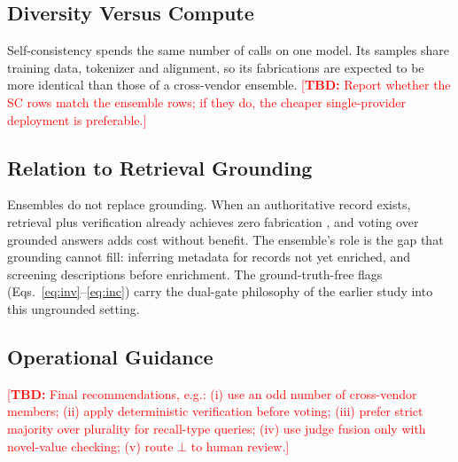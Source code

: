 \documentclass[11pt]{article}
\newcommand{\TBD}[1]{\textcolor{red}{[\textbf{TBD:} #1]}}
\begin{document}
\subsection{Diversity Versus Compute}
Self-consistency spends the same number of calls on one model. Its samples share training data, tokenizer and alignment, so its fabrications are expected to be more identical than those of a cross-vendor ensemble. \TBD{Report whether the SC rows match the ensemble rows; if they do, the cheaper single-provider deployment is preferable.}

\subsection{Relation to Retrieval Grounding}
Ensembles do not replace grounding. When an authoritative record exists, retrieval plus verification already achieves zero fabrication \citep{anon2026grounding}, and voting over grounded answers adds cost without benefit. The ensemble's role is the gap that grounding cannot fill: inferring metadata for records not yet enriched, and screening descriptions before enrichment. The ground-truth-free flags (Eqs.~\eqref{eq:inv}--\eqref{eq:inc}) carry the dual-gate philosophy of the earlier study into this ungrounded setting.

\subsection{Operational Guidance}
\TBD{Final recommendations, e.g.: (i) use an odd number of cross-vendor members; (ii) apply deterministic verification before voting; (iii) prefer strict majority over plurality for recall-type queries; (iv) use judge fusion only with novel-value checking; (v) route $\bot$ to human review.}

\end{document}
